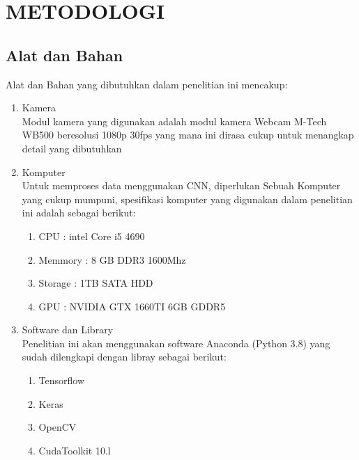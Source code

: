 \documentclass[a4paper]{article}
\begin{document}
\begin{enumerate}
\begin{enumerate}
				\end{enumerate}
				
			\end{enumerate}
	
	\newpage
	\section{METODOLOGI}
		\subsection{Alat dan Bahan}
			Alat dan Bahan yang dibutuhkan dalam penelitian ini mencakup:
			\begin{enumerate}
				\item Kamera\\
				Modul kamera yang digunakan adalah modul kamera Webcam M-Tech WB500 beresolusi 1080p 30fps yang mana ini dirasa cukup untuk menangkap detail yang dibutuhkan
				\item Komputer\\
				Untuk memproses data menggunakan CNN, diperlukan Sebuah Komputer yang cukup mumpuni, spesifikasi komputer yang digunakan dalam penelitian ini adalah sebagai berikut:
				\begin{enumerate}[nolistsep]
					\item CPU   : intel Core i5 4690
					\item Memmory   : 8 GB DDR3 1600Mhz
					\item Storage   : 1TB SATA HDD
					\item GPU   : NVIDIA GTX 1660TI 6GB GDDR5
				\end{enumerate}
				\item Software dan Library\\
				Penelitian ini akan menggunakan software Anaconda (Python 3.8) yang sudah dilengkapi dengan libray sebagai berikut:
				\begin{enumerate}[nolistsep]
					\item Tensorflow
					\item Keras
					\item OpenCV
					\item CudaToolkit 10.l
				\end{enumerate}
			\end{enumerate}
\end{document}
